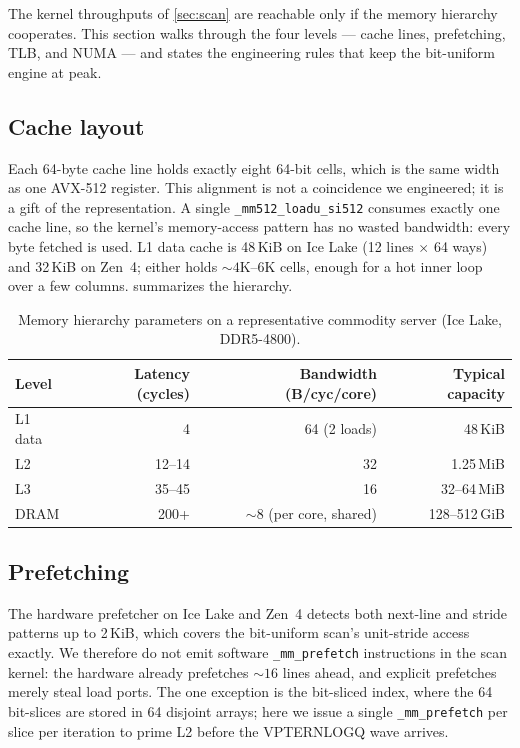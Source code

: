 \documentclass[10pt]{article}
\theoremstyle{definition}
\begin{document}
The kernel throughputs of \cref{sec:scan} are reachable only if the memory hierarchy cooperates. This section walks through the four levels --- cache lines, prefetching, TLB, and NUMA --- and states the engineering rules that keep the bit-uniform engine at peak.

\subsection{Cache layout}

Each 64-byte cache line holds exactly eight 64-bit cells, which is the same width as one AVX-512 register. This alignment is not a coincidence we engineered; it is a gift of the representation. A single \texttt{\_mm512\_loadu\_si512} consumes exactly one cache line, so the kernel's memory-access pattern has no wasted bandwidth: every byte fetched is used. L1 data cache is 48\,KiB on Ice Lake (12 lines $\times$ 64 ways) and 32\,KiB on Zen~4; either holds $\sim\!4$K--6K cells, enough for a hot inner loop over a few columns.  summarizes the hierarchy.

\begin{table}[t]
\centering
\caption{Memory hierarchy parameters on a representative commodity server (Ice Lake, DDR5-4800).}
\label{tab:memhier}
\small
\begin{tabular}{lrrr}
\toprule
Level & Latency (cycles) & Bandwidth (B/cyc/core) & Typical capacity \\
\midrule
L1 data & 4 & 64 (2 loads) & 48\,KiB \\
L2      & 12--14 & 32 & 1.25\,MiB \\
L3      & 35--45 & 16 & 32--64\,MiB \\
DRAM    & 200+ & $\sim$8 (per core, shared) & 128--512\,GiB \\
\bottomrule
\end{tabular}
\end{table}

\subsection{Prefetching}

The hardware prefetcher on Ice Lake and Zen~4 detects both next-line and stride patterns up to 2\,KiB, which covers the bit-uniform scan's unit-stride access exactly. We therefore do not emit software \texttt{\_mm\_prefetch} instructions in the scan kernel: the hardware already prefetches $\sim\!16$ lines ahead, and explicit prefetches merely steal load ports. The one exception is the bit-sliced index, where the 64 bit-slices are stored in 64 disjoint arrays; here we issue a single \texttt{\_mm\_prefetch} per slice per iteration to prime L2 before the VPTERNLOGQ wave arrives.
\end{document}
